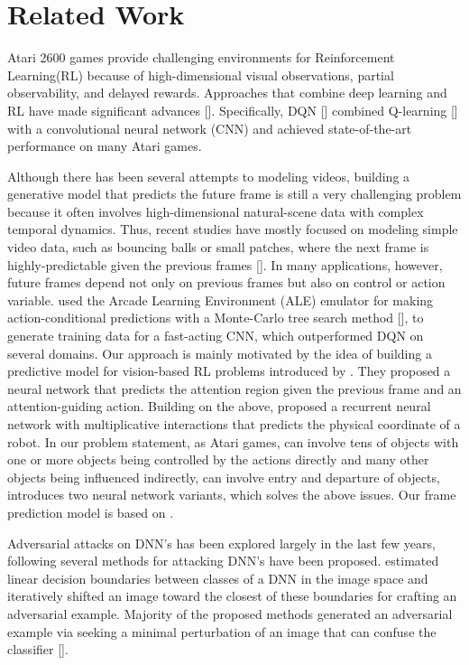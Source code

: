 \section{Related Work}

Atari 2600 games provide challenging environments for Reinforcement Learning(RL) because of high-dimensional visual observations, partial observability, and delayed rewards. Approaches that combine deep learning and RL have made significant advances [\cite{one, two, three}]. Specifically, DQN [\cite{one}] combined Q-learning [\cite{four}] with a convolutional neural network (CNN) and achieved state-of-the-art performance on many Atari games. 

Although there has been several attempts to modeling videos, building a generative model that predicts the future frame is still a very challenging problem because it often involves high-dimensional natural-scene data with complex temporal dynamics. Thus, recent studies have mostly focused on modeling simple video data, such as bouncing balls or small patches, where the next frame is highly-predictable given the previous frames [\cite{fifteen, sixteen}]. In many applications, however, future frames depend not only on previous frames but also on control or action variable. \cite{three} used the Arcade Learning Environment (ALE) emulator for making action-conditional predictions with a Monte-Carlo tree search method [\cite{five}], to generate training data for a fast-acting CNN, which outperformed DQN on several domains. Our approach is mainly motivated by the idea of building a predictive model for vision-based RL problems introduced by \cite{six}. They proposed a neural network that predicts the attention region given the previous frame and an attention-guiding action. Building on the above, \cite{seven} proposed a recurrent neural network with multiplicative interactions that predicts the physical coordinate of a robot. In our problem statement, as Atari games, can involve tens of objects with one or more objects being controlled by the actions directly and many other objects being influenced indirectly, can involve entry and departure of objects, \cite{eight} introduces two neural network variants, which solves the above issues. Our frame prediction model is based on \cite{eight}.

Adversarial attacks on DNN's has been explored largely in the last few years, following \cite{nine} several methods for attacking DNN's have been proposed. \cite{twelve} estimated linear decision boundaries between classes of a DNN in the image space and iteratively shifted an image toward the closest of these boundaries for crafting an adversarial example. Majority of the proposed methods generated an adversarial example via seeking a minimal perturbation of an image that can confuse the classifier [\cite{ten, eleven}]. 

